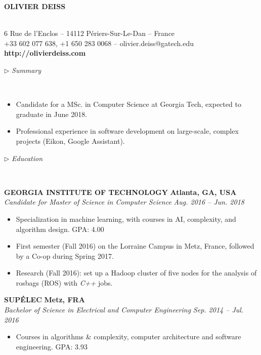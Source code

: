 \documentclass[a4paper, 12pt]{article}
\newcommand{\marginline}{-0.3cm}
\newcommand{\margincontent}{-0.6cm}
\newcommand{\marginsummary}{-0.3cm}
\newcommand{\marginbeforesection}{0.35cm}
\newcommand{\marginaftersummary}{0.2cm}
\newcommand{\linewidthperso}{0.02cm}
\newcommand{\styletitle}[1]{\textbf{#1}}
\newcommand{\styledesc}[1]{\textit{#1}}
\newcommand{\styleloc}[1]{\textbf{#1}}
\newcommand{\styledates}[1]{\textit{#1}}
\newcommand{\stylesection}[1]{
  \vspace{\marginbeforesection}
  \begin{normalsize}$\triangleright$ \textit{#1}\end{normalsize}
  \vspace{\marginline}\\
  \noindent\makebox[\linewidth]{\rule{\textwidth}{\linewidthperso}}

}
\begin{document}
\begin{footnotesize}

\begin{center}
  \begin{small}\textbf{OLIVIER DEISS}\end{small}\\
  6 Rue de l'Enclos -- 14112 P\'eriers-Sur-Le-Dan -- France\\
  +33 602 077 638, +1 650 283 0068 -- olivier.deiss@gatech.edu\\
  \textbf{http://olivierdeiss.com}
\end{center}

\stylesection{Summary}

\vspace{\marginsummary}
\begin{itemize}
  \item Candidate for a MSc. in Computer Science at Georgia Tech, expected to graduate in June 2018.
  \item Professional experience in software development on large-scale, complex projects (Eikon, Google Assistant).
\end{itemize}
\vspace{\marginaftersummary}

\stylesection{Education}

\styletitle{GEORGIA INSTITUTE OF TECHNOLOGY} \hfill \styleloc{Atlanta, GA, USA}\\
\styledesc{Candidate for Master of Science in Computer Science} \hfill \styledates{Aug. 2016 -- Jun. 2018}\\
\vspace{\margincontent}
\begin{itemize}
  \item Specialization in machine learning, with courses in AI, complexity, and algorithm design. \hfill GPA: 4.00
  \item First semester (Fall 2016) on the Lorraine Campus in Metz, France, followed by a Co-op during Spring 2017.
  \item Research (Fall 2016): set up a Hadoop cluster of five nodes for the analysis of rosbags (ROS) with \textit{C++} jobs.
\end{itemize}

\styletitle{SUP\'ELEC} \hfill \styleloc{Metz, FRA}\\
\styledesc{Bachelor of Science in Electrical and Computer Engineering} \hfill \styledates{Sep. 2014 -- Jul. 2016}\\
\vspace{\margincontent}
\begin{itemize}
  \item Courses in algorithms \& complexity, computer architecture and software engineering. \hfill GPA: 3.93
\end{itemize}


\end{footnotesize}
\end{document}
